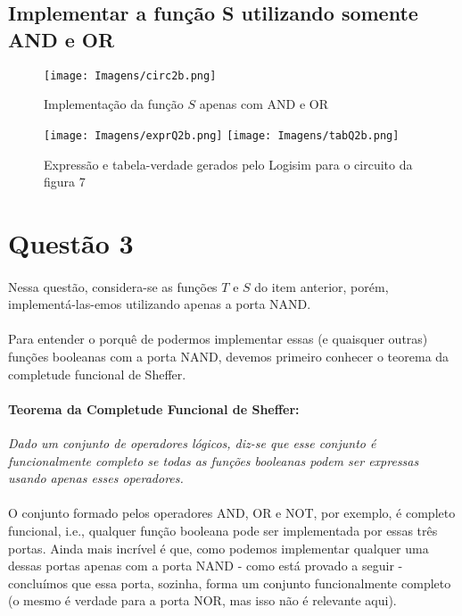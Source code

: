 \documentclass[a4paper, 12pt]{article}
\begin{document}
\subsection{Implementar a função S utilizando somente AND e OR}

\begin{figure}[H]
    \centering
    \texttt{[image: Imagens/circ2b.png]}
    \caption{Implementação da função $S$ apenas com AND e OR}
\end{figure}

\begin{figure}[H]
    \centering
    \texttt{[image: Imagens/exprQ2b.png]}
    \texttt{[image: Imagens/tabQ2b.png]} \\
    \caption{Expressão e tabela-verdade gerados pelo Logisim para o circuito da figura 7}
\end{figure}

\section{Questão 3}
\paragraph{}
Nessa questão, considera-se as funções $T$ e $S$ do item anterior, porém, implementá-las-emos utilizando apenas a porta NAND.

\paragraph{}
Para entender o porquê de podermos implementar essas (e quaisquer outras) funções booleanas com a porta NAND, devemos primeiro conhecer o teorema da completude funcional de Sheffer.

\paragraph{Teorema da Completude Funcional de Sheffer:}
\textit{Dado um conjunto de operadores lógicos, diz-se que esse conjunto é funcionalmente completo se todas as funções booleanas podem ser expressas usando apenas esses operadores.}

\paragraph{}
O conjunto formado pelos operadores AND, OR e NOT, por exemplo, é completo funcional, i.e., qualquer função booleana pode ser implementada por essas três portas. Ainda mais incrível é que, como podemos implementar qualquer uma dessas portas apenas com a porta NAND - como está provado a seguir - concluímos que essa porta, sozinha, forma um conjunto funcionalmente completo (o mesmo é verdade para a porta NOR, mas isso não é relevante aqui).
\end{document}

